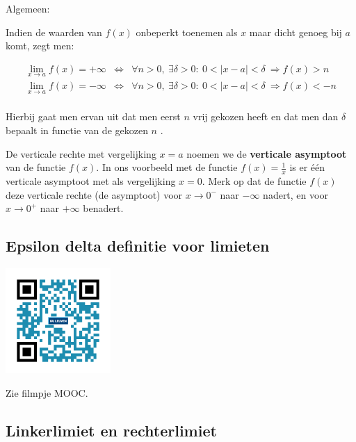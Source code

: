 Algemeen:

Indien de waarden van $f(x)$ onbeperkt toenemen als $x$ maar dicht
genoeg bij $a$ komt, zegt men:

\begin{eqnarray*}
{\displaystyle \lim_{x\to a}}f(x)=+\infty & \Leftrightarrow & \forall n>0,\:\exists\delta>0:\:0<\left|x-a\right|<\delta\:\Rightarrow f(x)>n\\
{\displaystyle \lim_{x\to a}}f(x)=-\infty & \Leftrightarrow & \forall n>0,\:\exists\delta>0:\:0<\left|x-a\right|<\delta\:\Rightarrow f(x)<-n\\
\end{eqnarray*}

Hierbij gaat men ervan uit dat men eerst $n$ vrij gekozen heeft en
dat men dan $\delta$ bepaalt in functie van de gekozen $n$ .



De verticale rechte met vergelijking $x=a$ noemen we de \textbf{verticale
asymptoot} van de functie $f(x)$. In ons voorbeeld met de functie
$f(x)={\displaystyle \frac{1}{x}}$ is er \'e\'en verticale asymptoot
met als vergelijking $x=0$. Merk op dat de functie $f(x)$ deze verticale
rechte (de asymptoot) voor $x\rightarrow0^{-}$ naar $-\infty$ nadert,
en voor $x\rightarrow0^{+}$ naar $+\infty$ benadert.

\subsection{Epsilon delta definitie voor limieten}
\begin{minipage}{.25\linewidth}
	\raggedright
	\includegraphics[width=4cm]{2_elem_rekenvaardigheden_B/inputs/QR_Code_EPSILONDELTA_module2}
\end{minipage}
\begin{minipage}{.7\linewidth}
	Zie filmpje MOOC.
\end{minipage}

\subsection{Linkerlimiet en rechterlimiet}

